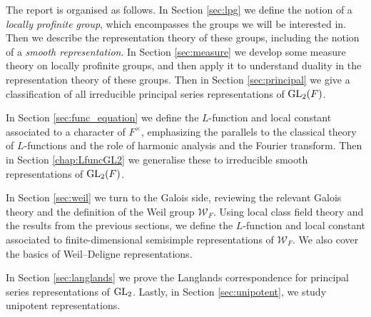 The report is organised as follows. In Section \ref{sec:lpg} we define the notion of a \emph{locally profinite group}, which encompasses the groups we will be interested in. Then we describe the representation theory of these groups, including the notion of a \emph{smooth representation}. In Section \ref{sec:measure} we develop some measure theory on locally profinite groups, and then apply it to understand duality in the representation theory of these groups. Then in Section \ref{sec:principal} we give a classification of all irreducible principal series representations of $\mathrm{GL}_2(F)$.

In Section \ref{sec:func_equation} we define the $L$-function and local constant associated to a character of $F^\times$, emphasizing the parallels to the classical theory of $L$-functions and the role of harmonic analysis and the Fourier transform. Then in Section \ref{chap:LfuncGL2} we generalise these to irreducible smooth representations of $\mathrm{GL}_2(F)$.

In Section \ref{sec:weil} we turn to the Galois side, reviewing the relevant Galois theory and the definition of the Weil group $\mathcal W_F$. Using local class field theory and the results from the previous sections, we define the $L$-function and local constant associated to finite-dimensional semisimple representations of $\mathcal{W}_F$. We also cover the basics of Weil--Deligne representations.

In Section \ref{sec:langlands} we prove the Langlands correspondence for principal series representations of $\mathrm{GL}_2$. Lastly, in Section \ref{sec:unipotent}, we study unipotent representations. 


\newpage